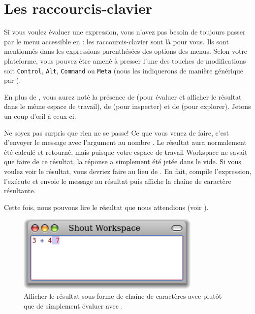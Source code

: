 \documentclass[a4paper,10pt,twoside]{book}
\begin{document}
\section{Les raccourcis-clavier}

Si vous voulez évaluer une expression, vous n'avez pas besoin de
toujours passer par le menu accessible en \actclickant: les
raccourcis-clavier sont là pour vous. Ils sont mentionnés
dans les expressions parenthésées des options des menus. Selon
votre plateforme, vous pouvez être amené à presser l'une des
touches de modifications soit \texttt{Control}, \texttt{Alt},
\texttt{Command} ou \texttt{Meta} (nous les indiquerons de manière
générique par ).

En plus de , vous aurez noté la présence de  
(pour évaluer et afficher le résultat dans le même espace de travail), 
de  (pour inspecter) et de  (pour
explorer). Jetons un coup d'\oe il à ceux-ci.


Ne soyez pas surpris que rien ne se passe!
Ce que vous venez de faire, c'est d'envoyer le message \ct{+}{} avec
l'argument  au nombre \mbox{.}
Le résultat  aura normalement été calculé et retourné, mais puisque votre espace de
travail Workspace ne savait que faire de ce résultat, la réponse a
simplement été jetée dans le vide. Si vous voulez voir le
résultat, vous devriez faire  au lieu
de . En fait,  compile l'expression,
l'exécute et envoie le message  au résultat puis
affiche la chaîne de caractère résultante.

Cette fois, nous pouvons lire le résultat que nous attendions (voir
).

\begin{figure}[htb]
\centerline {\includegraphics[width=0.8\textwidth]{PrintIt}}
\caption{Afficher le résultat sous forme de chaîne de
  caractères avec  plutôt que de simplement
  évaluer avec .}
\end{figure}
\end{document}
